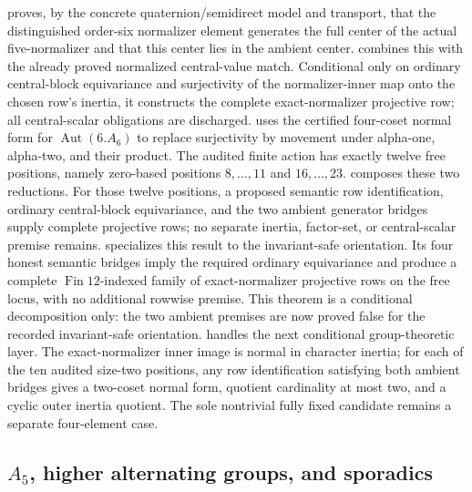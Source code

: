 \documentclass[11pt]{article}
\begin{document}
proves, by the concrete quaternion/semidirect model and transport, that the
distinguished order-six normalizer element generates the full center of
the actual five-normalizer and that this center lies in the ambient center.
 combines this
with the already proved normalized central-value match.  Conditional only
on ordinary central-block equivariance and surjectivity of the
normalizer-inner map onto the chosen row's inertia, it constructs the
complete exact-normalizer projective row; all central-scalar obligations
are discharged.
 uses the certified four-coset
normal form for \(\operatorname{Aut}(6.A_6)\) to replace surjectivity by
movement under alpha-one, alpha-two, and their product.  The audited finite
action has exactly twelve free positions, namely zero-based positions
\(8,\ldots,11\) and \(16,\ldots,23\).
 composes these two
reductions.  For those twelve positions, a proposed semantic row
identification, ordinary central-block equivariance, and the two ambient
generator bridges supply complete projective rows; no separate inertia,
factor-set, or central-scalar premise remains.
specializes this result to the invariant-safe orientation.  Its four honest
semantic bridges imply the required ordinary equivariance and produce a
complete \(\operatorname{Fin}12\)-indexed family of exact-normalizer
projective rows on the free locus, with no additional rowwise premise.
This theorem is a conditional decomposition only: the two ambient
premises are now proved false for the recorded invariant-safe orientation.
 handles the next
conditional group-theoretic layer.  The exact-normalizer inner image is
normal in character inertia; for each of the ten audited size-two
positions, any row identification satisfying both ambient bridges gives a
two-coset normal form, quotient cardinality at most two, and a cyclic outer
inertia quotient.  The sole nontrivial fully fixed candidate remains a
separate four-element case.

\subsection{\(A_5\), higher alternating groups, and sporadics}
\end{document}
